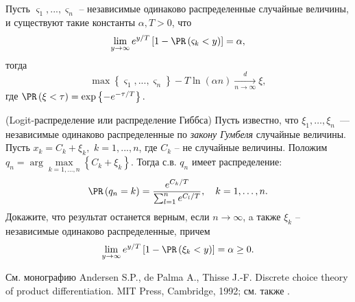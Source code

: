 \begin{problem} 
\label{gumbel}
Пусть $\varsigma _{1} ,...,\varsigma _{n} $ -- независимые одинаково распределенные случайные величины, и существуют такие константы $\alpha ,T>0$, что
\[\mathop{\lim }\limits_{y\to \infty } e^{{y\mathord{\left/ {\vphantom {y T}} \right. \kern-\nulldelimiterspace} T} } \left[1-\PR\left(\varsigma _{k} <y\right)\right]=\alpha , \] 
тогда
\[
\max \left\{\varsigma _{1} ,...,\varsigma _{n} \right\}-T\ln \left(\alpha n\right)\xrightarrow[{n\to \infty }]{d} \xi,  
\]
\noindent где $\PR\left(\xi <\tau \right)=\exp \left\{-e^{-{\tau \mathord{\left/ {\vphantom {\tau  T}} \right. \kern-\nulldelimiterspace} T} } \right\}.$

\end{problem}


\begin{problem}\Star(Logit-распределение или распределение Гиббса)
\label{gibbs}
Пусть известно, что $\xi_{1} ,\ldots,\xi_{n}$~--- независимые одинаково распределенные по \textit{закону Гумбеля} случайные величины. Пусть  $x_{k} =C_{k} +\xi _{k} ,$ $k=1,...,n$, где $C_{k} $ -- не случайные величины. Положим $q_n=\arg \mathop{\max }\limits_{k=1,\ldots,n} \left\{C_{k} +\xi _{k} \right\}$. Тогда с.в. $q_n$ имеет распределение:
\[\PR\left(q_n=k\right)=\frac{e^{{C_{k} \mathord{\left/ {\vphantom {C_{k}  T}} \right. \kern-\nulldelimiterspace} T} } }{\sum _{l=1}^{n}e^{{C_{l} \mathord{\left/ {\vphantom {C_{l}  T}} \right. \kern-\nulldelimiterspace} T} }  } , \quad k=1,\ldots,n.\] 
Докажите, что результат останется верным, если $n \to \infty$, a также $\xi_k$ -- независимые одинаково распределенные, причем 
\[
\mathop{\lim }\limits_{y\to \infty } e^{{y\mathord{\left/ {\vphantom {y T}} \right. \kern-\nulldelimiterspace} T} } \left[1-\PR\left(\xi _{k} <y\right)\right]=\alpha \geq 0. 
\]
\end{problem}
\begin{remark}
См. монографию Andersen S.P., de Palma A., Thisse J.-F. Discrete choice theory of product differentiation. MIT Press, Cambridge, 1992; см. также \cite{222}.
\end{remark}



